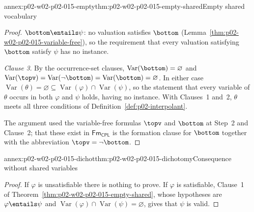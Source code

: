 \begin{annexitem}{annex:p02-w02-p02-015-empty}{thm:p02-w02-p02-015-empty-shared}{Empty shared vocabulary}
\begin{proof}
\(\bottom\entails\psi\): no valuation satisfies \(\bottom\)
(Lemma~\ref{thm:p02-w02-p02-015-variable-free}), so the requirement that every
valuation satisfying \(\bottom\) satisfy \(\psi\) has no instance.

\emph{Clause 3.}  By the occurrence-set clauses,
\(\operatorname{Var}(\bottom)=\varnothing\) and
\(\operatorname{Var}(\topv)=\operatorname{Var}(\neg\bottom)=
\operatorname{Var}(\bottom)=\varnothing\).  In either case
\(\operatorname{Var}(\theta)=\varnothing\subseteq\operatorname{Var}(\varphi)
\cap\operatorname{Var}(\psi)\), so the statement that every variable of
\(\theta\) occurs in both \(\varphi\) and \(\psi\) holds, having no instance.
With Clauses~1 and~2, \(\theta\) meets all three conditions of
Definition~\ref{def:p02-interpolant}.

The argument used the variable-free formulas \(\topv\) and \(\bottom\) at
Step~2 and Clause~2; that these exist in \(\mathsf{Fm}_{\mathsf{CPL}}\) is the formation clause
for \(\bottom\) together with the abbreviation \(\topv=\neg\bottom\).
\end{proof}
\end{annexitem}

\begin{annexitem}{annex:p02-w02-p02-015-dichot}{thm:p02-w02-p02-015-dichotomy}{Consequence without shared variables}
\begin{proof}
If \(\varphi\) is unsatisfiable there is nothing to prove.  If \(\varphi\) is
satisfiable, Clause~1 of Theorem~\ref{thm:p02-w02-p02-015-empty-shared},
whose hypotheses are \(\varphi\entails\psi\) and
\(\operatorname{Var}(\varphi)\cap\operatorname{Var}(\psi)=\varnothing\), gives
that \(\psi\) is valid.
\end{proof}
\end{annexitem}

